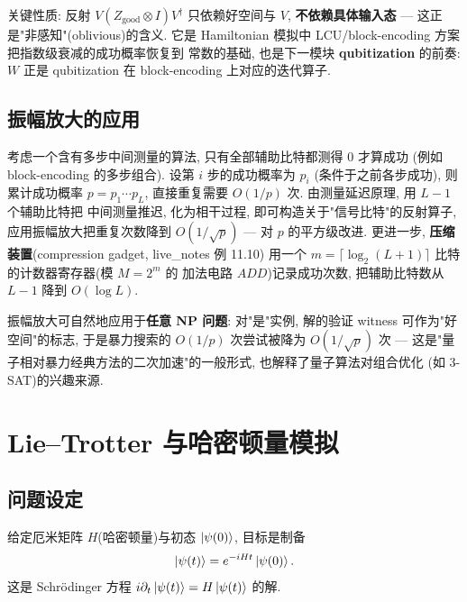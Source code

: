\documentclass[utf8]{article} %
\numberwithin{equation}{section}   %
\newtheorem{Def}{\hskip 2em {\color{green} 定义}}[subsection]
\newtheorem{Note}{\hskip 2em {\color{red} 注}}[subsection]
\begin{document}
\begin{Note}
    关键性质: 反射 $V(Z_{\mathrm{good}}\otimes I)V^\dagger$ 只依赖好空间与 $V$,
    \textbf{不依赖具体输入态} --- 这正是"非感知"(oblivious)的含义. 它是
    Hamiltonian 模拟中 LCU/block-encoding 方案把指数级衰减的成功概率恢复到
    常数的基础, 也是下一模块 \textbf{qubitization} 的前奏:
    $W$ 正是 qubitization 在 block-encoding 上对应的迭代算子.
\end{Note}

\subsection{振幅放大的应用}

\begin{Note}[多阶段中间测量的算法]
    考虑一个含有多步中间测量的算法, 只有全部辅助比特都测得 $0$ 才算成功
    (例如 block-encoding 的多步组合). 设第 $i$ 步的成功概率为 $p_i$
    (条件于之前各步成功), 则累计成功概率 $p = p_1 \cdots p_L$,
    直接重复需要 $O(1/p)$ 次. 由测量延迟原理, 用 $L-1$ 个辅助比特把
    中间测量推迟, 化为相干过程, 即可构造关于"信号比特"的反射算子, 
    应用振幅放大把重复次数降到 $O(1/\sqrt{p})$ --- 对 $p$ 的平方级改进.
    更进一步, \textbf{压缩装置}(compression gadget, live\_notes 例 11.10)
    用一个 $m = \lceil \log_2(L+1) \rceil$ 比特的计数器寄存器(模 $M = 2^m$ 的
    加法电路 $ADD$)记录成功次数, 把辅助比特数从 $L-1$ 降到 $O(\log L)$.
\end{Note}

\begin{Note}[与 NP 类问题的联系]
    振幅放大可自然地应用于\textbf{任意 NP 问题}: 对"是"实例, 解的验证 witness
    可作为"好空间"的标志, 于是暴力搜索的 $O(1/p)$ 次尝试被降为 $O(1/\sqrt{p})$ 次 ---
    这是"量子相对暴力经典方法的二次加速"的一般形式, 也解释了量子算法对组合优化
    (如 3-SAT)的兴趣来源.
\end{Note}

\section{Lie--Trotter 与哈密顿量模拟}
\subsection{问题设定}

\begin{Def}[哈密顿量模拟]
    给定厄米矩阵 $H$(哈密顿量)与初态 $\ket{\psi(0)}$, 目标是制备
    \begin{equation}
        \ket{\psi(t)} = e^{-iHt}\ket{\psi(0)}.
    \end{equation}
    这是 Schrödinger 方程 $i\partial_t \ket{\psi(t)} = H\ket{\psi(t)}$ 的解.
\end{Def}
\end{document}
